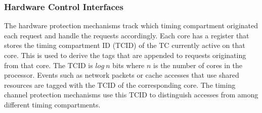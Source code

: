 


\subsubsection{Hardware Control Interfaces}



The hardware protection mechanisms track which timing compartment originated 
each request and handle the requests accordingly. Each core has a register that 
stores the timing compartment ID (TCID) of the TC currently active on that core. This is used to derive 
the tags that are appended to requests originating from that core. The TCID is 
$log\ n$ bits where $n$ is the number of cores in the processor.
Events such as network packets or cache accesses that use shared resources are 
tagged with the TCID of the corresponding core. 
The timing channel protection mechanisms use this TCID to distinguish accesses
from among different timing compartments.

